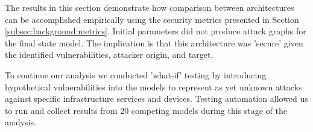 
The results in this section demonstrate how comparison between architectures can be accomplished empirically using the security metrics presented in Section \ref{subsec:background:metrics}. Initial parameters did not produce attack graphs for the final state model. The implication is that this architecture was 'secure' given the identified vulnerabilities, attacker origin, and target. 

To continue our analysis we conducted 'what-if' testing by introducing hypothetical vulnerabilities into the models to represent as yet unknown attacks against specific infrastructure services and devices. Testing automation allowed us to run and collect results from 20 competing models during this stage of the analysis. 

